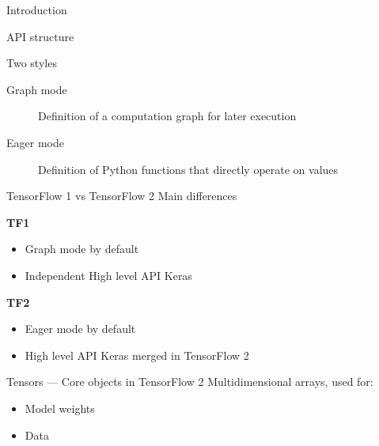 \begin{frame}{Introduction}
\end{frame}

\begin{frame}{API structure}
  \centering
\end{frame}

\begin{frame}{Two styles}
  \begin{description}
    \item[Graph mode] Definition of a computation graph for later execution
    \item[Eager mode] Definition of Python functions that directly operate on values
  \end{description}
\end{frame}

\begin{frame}{TensorFlow 1 vs TensorFlow 2}
  \centering
  Main differences

  \begin{minipage}[l]{0.5\linewidth}
    \centering
    \textbf{TF1}
    \begin{itemize}[<+->]
      \item Graph mode by default
      \item Independent High level API Keras
    \end{itemize}
  \end{minipage}\hfill
  \begin{minipage}[l]{0.49\linewidth}
    \setcounter{beamerpauses}{1}
    \centering
    \textbf{TF2}
    \begin{itemize}[<+->]
      \item Eager mode by default
      \item High level API Keras merged in TensorFlow 2
    \end{itemize}
  \end{minipage}\hfill
\end{frame}

\begin{frame}{Tensors --- Core objects in TensorFlow 2}
  Multidimensional arrays, used for:

  \begin{itemize}[<+->]
    \item Model weights
    \item Data
  \end{itemize}

\end{frame}

